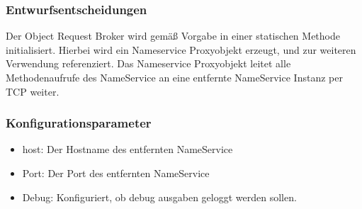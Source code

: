 \documentclass{article}
\begin{document}
\subsubsection{Entwurfsentscheidungen}
Der Object Request Broker wird gemäß Vorgabe in einer statischen Methode initialisiert.
Hierbei wird ein Nameservice Proxyobjekt erzeugt, und zur weiteren Verwendung referenziert.
Das Nameservice Proxyobjekt leitet alle Methodenaufrufe des NameService an eine entfernte
NameService Instanz per TCP weiter.

\subsubsection{Konfigurationsparameter}

\begin{itemize}
    \item host: Der Hostname des entfernten NameService
    \item Port: Der Port des entfernten NameService
	\item Debug: Konfiguriert, ob debug ausgaben geloggt werden sollen.
\end{itemize}
\end{document}
